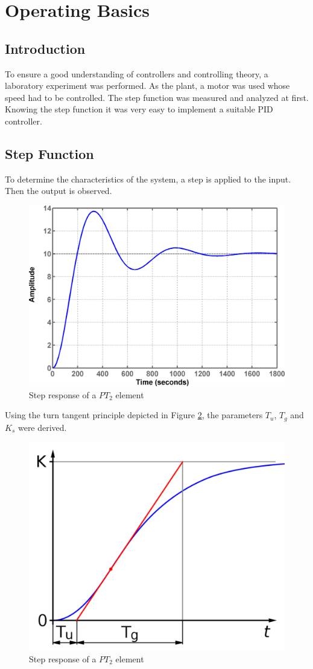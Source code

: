 \section{Operating Basics}

\subsection{Introduction}

To ensure a good understanding of controllers and controlling theory, a laboratory experiment was performed. As the plant, a motor was used whose speed had to be controlled.
The step function was measured and analyzed at first. Knowing the step function it was very easy to implement a suitable PID controller.

\subsection{Step Function}

To determine the characteristics of the system, a step is applied to the input. Then the output is observed.

\begin{figure}[H]
\begin{center}
\includegraphics[width=0.6\linewidth]{images/general/step_pt2}
\end{center}
\caption{Step response of a $PT_2$ element}
\label{fig:step_pt2}
\end{figure}

Using the turn tangent principle depicted in Figure \ref{fig:wendetangentenverfahren}, the parameters $T_u$, $T_g$ and $K_s$ were derived.

\begin{figure}[H]
\begin{center}
\includegraphics[width=0.6\linewidth]{images/general/wendetangentenverfahren}
\end{center}
\caption{Step response of a $PT_2$ element}
\label{fig:wendetangentenverfahren}
\end{figure}
